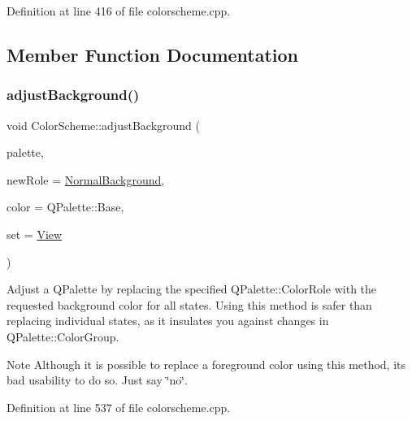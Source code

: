 Definition at line 416 of file colorscheme.\+cpp.



\subsection{Member Function Documentation}
\mbox{\label{class_color_scheme_a6f5d2968152d0d1f76c1e6720c185850}} 
\subsubsection{\texorpdfstring{adjust\+Background()}{adjustBackground()}}
{\footnotesize\ttfamily void Color\+Scheme\+::adjust\+Background (\begin{DoxyParamCaption}\item[{Q\+Palette \&}]{palette,  }\item[{\hyperlink{class_color_scheme_a70715e73df1fb0f140797633f8043a8c}{Background\+Role}}]{new\+Role = {\ttfamily \hyperlink{class_color_scheme_a70715e73df1fb0f140797633f8043a8ca9762dd3095372ba69df3c550d96af844}{Normal\+Background}},  }\item[{Q\+Palette\+::\+Color\+Role}]{color = {\ttfamily QPalette\+:\+:Base},  }\item[{\hyperlink{class_color_scheme_a56ea451e86dffa1822ed087902844e05}{Color\+Set}}]{set = {\ttfamily \hyperlink{class_color_scheme_a56ea451e86dffa1822ed087902844e05a45150fc89ebfd98918cb57ecae48f7c8}{View}} }\end{DoxyParamCaption})\hspace{0.3cm}{\ttfamily [static]}}

Adjust a Q\+Palette by replacing the specified Q\+Palette\+::\+Color\+Role with the requested background color for all states. Using this method is safer than replacing individual states, as it insulates you against changes in Q\+Palette\+::\+Color\+Group.

\begin{DoxyNote}{Note}
Although it is possible to replace a foreground color using this method, it\textquotesingle{}s bad usability to do so. Just say \char`\"{}no\char`\"{}. 
\end{DoxyNote}


Definition at line 537 of file colorscheme.\+cpp.

\mbox{\label{class_color_scheme_a3d2585cb284a9c5efa5c82feb9499251}} 
